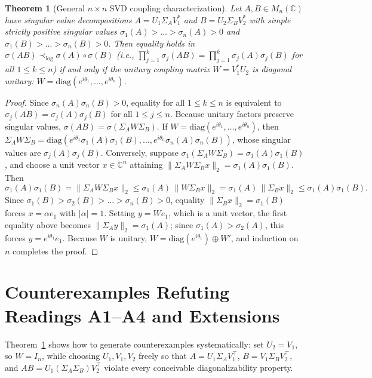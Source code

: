 \documentclass[11pt,a4paper]{article}
\newtheorem{theorem}{Theorem}[section]
\theoremstyle{definition}
\newcommand{\C}{\mathbb{C}}
\newcommand{\diag}{\mathrm{diag}}
\begin{document}
\begin{theorem}[General $n\times n$ SVD coupling characterization]\label{thm:svd-coupling}
Let $A, B \in M_n(\C)$ have singular value decompositions $A = U_1 \Sigma_A V_1^*$ and $B = U_2 \Sigma_B V_2^*$ with simple strictly positive singular values $\sigma_1(A) > \dots > \sigma_n(A) > 0$ and $\sigma_1(B) > \dots > \sigma_n(B) > 0$. Then equality holds in $\sigma(AB) \prec_{\log} \sigma(A)\circ\sigma(B)$ (i.e., $\prod_{j=1}^k \sigma_j(AB) = \prod_{j=1}^k \sigma_j(A)\sigma_j(B)$ for all $1 \le k \le n$) if and only if the unitary coupling matrix $W = V_1^* U_2$ is diagonal unitary: $W = \diag(e^{i\theta_1}, \dots, e^{i\theta_n})$.
\end{theorem}

\begin{proof}
Since $\sigma_n(A)\sigma_n(B) > 0$, equality for all $1 \le k \le n$ is equivalent to $\sigma_j(AB) = \sigma_j(A)\sigma_j(B)$ for all $1 \le j \le n$. Because unitary factors preserve singular values, $\sigma(AB) = \sigma(\Sigma_A W \Sigma_B)$. If $W = \diag(e^{i\theta_1}, \dots, e^{i\theta_n})$, then $\Sigma_A W \Sigma_B = \diag(e^{i\theta_1}\sigma_1(A)\sigma_1(B), \dots, e^{i\theta_n}\sigma_n(A)\sigma_n(B))$, whose singular values are $\sigma_j(A)\sigma_j(B)$. Conversely, suppose $\sigma_1(\Sigma_A W \Sigma_B) = \sigma_1(A)\sigma_1(B)$, and choose a unit vector $x \in \C^n$ attaining $\|\Sigma_A W \Sigma_B x\|_2 = \sigma_1(A)\sigma_1(B)$. Then
\[
  \sigma_1(A)\sigma_1(B) = \|\Sigma_A W \Sigma_B x\|_2 \le \sigma_1(A)\,\|W \Sigma_B x\|_2 = \sigma_1(A)\,\|\Sigma_B x\|_2 \le \sigma_1(A)\sigma_1(B).
\]
Since $\sigma_1(B) > \sigma_2(B) > \dots > \sigma_n(B) > 0$, equality $\|\Sigma_B x\|_2 = \sigma_1(B)$ forces $x = \alpha e_1$ with $|\alpha| = 1$. Setting $y = W e_1$, which is a unit vector, the first equality above becomes $\|\Sigma_A y\|_2 = \sigma_1(A)$; since $\sigma_1(A) > \sigma_2(A)$, this forces $y = e^{i\theta_1} e_1$. Because $W$ is unitary, $W = \diag(e^{i\theta_1}) \oplus W'$, and induction on $n$ completes the proof.
\end{proof}

\section{Counterexamples Refuting Readings A1--A4 and Extensions}\label{sec:counterexamples}

Theorem~\ref{thm:svd-coupling} shows how to generate counterexamples systematically: set $U_2 = V_1$, so $W = I_n$, while choosing $U_1, V_1, V_2$ freely so that $A = U_1 \Sigma_A V_1^\top$, $B = V_1 \Sigma_B V_2^\top$, and $AB = U_1(\Sigma_A \Sigma_B)V_2^\top$ violate every conceivable diagonalizability property.
\end{document}
